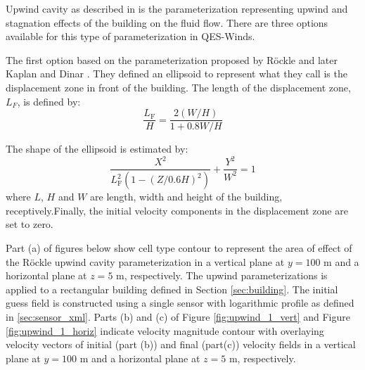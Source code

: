 Upwind cavity as described in \cite{nelson20085,bagal2004improved,gowardhan2010evaluation} is the parameterization representing upwind and stagnation effects of the building on the fluid flow. There are three options available for this type of parameterization in QES-Winds. 

The first option based on the parameterization proposed by R\"{o}ckle \cite{rockle1990bestimmung} and later Kaplan and Dinar \cite{kaplan1996lagrangian}. They defined an ellipsoid to represent what they call is the displacement zone in front of the building. The length of the displacement zone, $L_F$, is defined by: 
\begin{equation}
\frac{L_{\mathrm{F}}}{H}=\frac{2(W / H)}{1+0.8 W / H}
\label{eq:lf}
\end{equation}

The shape of the ellipsoid is estimated by:
\begin{equation}
\frac{X^{2}}{L_{\mathrm{F}}^{2}\left(1-(Z / 0.6 H)^{2}\right)}+\frac{Y^{2}}{W^{2}}=1
\label{eq:upwind}
\end{equation}
where $L$, $H$ and $W$ are length, width and height of the building, receptively.Finally, the initial velocity components in the displacement zone are set to zero.


Part (a) of figures below show cell type contour to represent the area of effect of the R\"{o}ckle upwind cavity parameterization in a vertical plane at $y=100$ m and a horizontal plane at $z=5$ m, respectively. The upwind parameterizations is applied to a rectangular building defined in Section \ref{sec:building}. The initial guess field is constructed using a single sensor with logarithmic profile as defined in \ref{sec:sensor_xml}. Parts (b) and (c) of Figure \ref{fig:upwind_1_vert} and Figure \ref{fig:upwind_1_horiz} indicate velocity magnitude contour with overlaying velocity vectors of initial (part (b)) and final (part(c)) velocity fields in a vertical plane at $y=100$ m and a horizontal plane at $z=5$ m, respectively.

